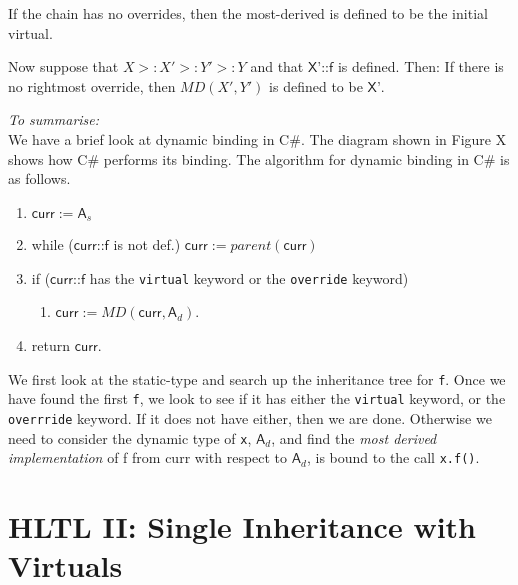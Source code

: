 If the chain has no overrides, then the most-derived is defined to be the initial virtual.


Now suppose that $X >: X' >: Y' >: Y$ and that $\textsf{X'::f}$ is defined. Then:
If there is no rightmost override, then $MD(X',Y')$ is defined to be $\textsf{X'}$.


\frmrule

\textit{To summarise:} \\
We have a brief look at dynamic binding in C\#.
The diagram shown in Figure X shows how C\# performs its binding. 
The algorithm for dynamic binding in C\# is as follows.

\begin{enumerate} [nosep]
  \item $\textsf{curr} := \textsf{A}_{s}$
  \item while ($\textsf{curr::f}$ is not def.) $\textsf{curr} := parent(\textsf{curr})$
  \item if ($\textsf{curr::f}$ has the \lstinline{virtual} keyword or the \lstinline{override} keyword)
  \begin{enumerate} [nosep] 
    \item $\textsf{curr} := MD(\textsf{curr}, \textsf{A}_{d})$.
  \end{enumerate}
  \item return $\textsf{curr}$.
\end{enumerate}

We first look at the static-type and search up the inheritance tree for \lstinline{f}.
Once we have found the first \lstinline{f}, we look to see if it has 
either the \lstinline{virtual} keyword, or the \lstinline{overrride} keyword.
If it does not have either, then we are done. Otherwise we need 
to consider the dynamic type of \lstinline{x}, $\textsf{A}_{d}$, 
and find the \textit{most derived implementation} of \textsf{f} 
from \textsf{curr} with respect to $\textsf{A}_{d}$, is bound to the call \lstinline{x.f()}.

\frmrule


\section{HLTL II: Single Inheritance with Virtuals}

